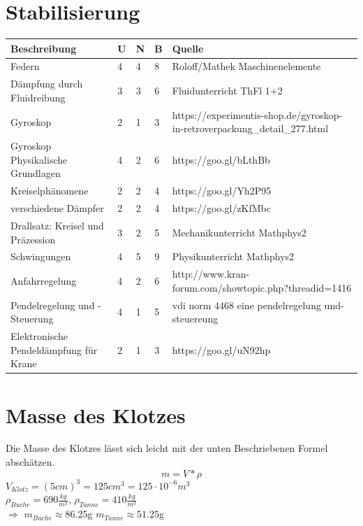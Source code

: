 \documentclass[a4paper]{report}
\begin{document}
\section{Stabilisierung}
\label{app:sec:Stable}
\vspace{1em}
\noindent
\begin{tabular}{|p{}|p{}|p{}|p{}|p{}|}
	\hline
	\textbf{Beschreibung} & \textbf{U} & \textbf{N} & \textbf{B} & \textbf{Quelle} \\
	\hline
	Federn &4 &4 &8 & Roloff/Mathek Maschinenelemente \\
	\hline
	Dämpfung durch Fluidreibung &3 &3 &6 & Fluidunterricht ThFl 1+2 \\
	\hline
	Gyroskop &2 &1 &3 & https://experimentis-shop.de/gyroskop-in-retroverpackung\_detail\_277.html \\
	\hline
	Gyroskop Physikalische Grundlagen &4 &2 &6 & https://goo.gl/bLthBb \\
	\hline
	Kreiselphänomene &2 &2 &4 & https://goo.gl/Yh2P95 \\
	\hline
	verschiedene Dämpfer &2 &2 &4 & https://goo.gl/zKfMbc \\
	\hline
	Drallsatz: Kreisel und Präzession &3 &2 &5 & Mechanikunterricht Mathphys2 \\
	\hline
	Schwingungen &4 &5 &9 & Physikunterricht Mathphys2 \\
	\hline
	Anfahrregelung &4 &2 &6 & http://www.kran-forum.com/showtopic.php?threadid=1416 \\
	\hline
	Pendelregelung und -Steuerung &4 &1 &5 & vdi norm 4468 eine pendelregelung und- steuereung \\
	\hline
	Elektronische Pendeldämpfung für Krane &2 &1 &3 & https://goo.gl/uN92hp\\
	\hline
\end{tabular}

\section{Masse des Klotzes}
\label{app:sec:RechKlotzMasse}
Die Masse des Klotzes lässt sich leicht mit der unten Beschriebenen Formel abschätzen.  \\
\begin{displaymath}
	m=V*\rho
\end{displaymath}
$V_{Klotz}=(5cm)^3=125cm^3=125\cdot10^{-6} m^3$ \\
$\rho_{Buche}=690\frac{kg}{m^3}$, $\rho_{Tanne}= 410\frac{kg}{m^3}$ \\
$\Rightarrow$ $m_{Buche} \approx 86.25$g \hspace*{10mm} $m_{Tanne} \approx 51.25$g
\end{document}
